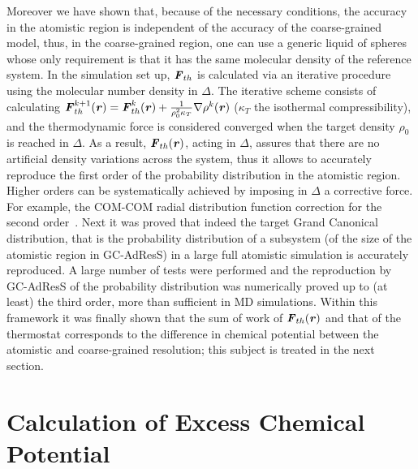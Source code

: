 \documentclass[a4paper,preprint,unsortedaddress]{revtex4-1}
\newcommand{\vect}[1]{\textbf{\textit{#1}}}
\begin{document}
Moreover we have shown that, because of the necessary conditions, the accuracy in the atomistic region is independent of the accuracy of the coarse-grained model, thus, in the coarse-grained region, one can use a generic liquid of spheres whose only requirement is that it has the same molecular density of the reference system. In the simulation set up, ${\vect F}_{th}$ is calculated via an iterative procedure {using} the molecular number density in $\Delta$. The iterative scheme consists of calculating {${\vect F}^{k+1}_{th}({\vect r}) = {\vect F}^{k}_{th}({\vect r}) + \frac{1}{\rho^2_{0}\kappa_{T}}\nabla \rho^{k}({\vect r})$} ($\kappa_{T}$ the isothermal compressibility), and the thermodynamic force is considered converged when the target density $\rho_{0}$ is reached in $\Delta$. As a result, ${\vect F}_{th}({\vect r})$, acting in $\Delta$, assures that there are no artificial density variations across the system, thus it allows to accurately reproduce the first order of the probability distribution in the atomistic region. Higher orders can be systematically achieved by imposing in $\Delta$ a corrective force.
{For example, the COM-COM radial distribution function correction for the second order~\cite{jctchan}.} Next it was proved that indeed the target Grand Canonical distribution, that is the probability distribution of a subsystem (of the size of the atomistic region in GC-AdResS) in a large full atomistic simulation is accurately reproduced. A large number of tests were performed and the reproduction by GC-AdResS of the probability distribution was numerically proved up to (at least) the third order, more than sufficient in MD simulations. Within this framework it was finally shown that the sum of work of ${\vect F}_{th}({\vect r})$ and that of the thermostat corresponds to the difference in chemical potential between the atomistic and coarse-grained resolution; this subject is treated in the next section.


\section{Calculation of Excess Chemical Potential}
\end{document}
